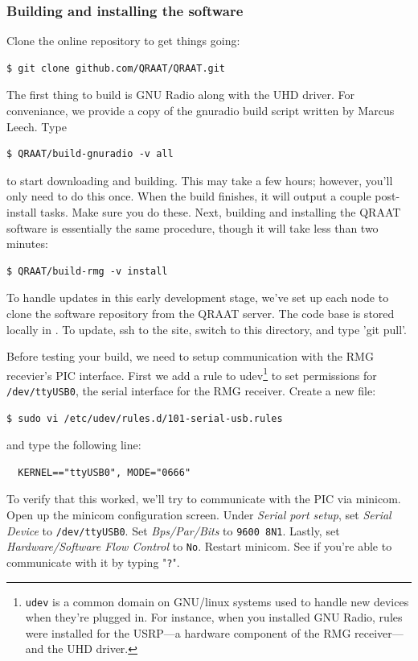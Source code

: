 \documentclass[letter]{article}
\newcounter{foot}
\begin{document}
\subsubsection{Building and installing the software}
Clone the online repository to get things going:
\begin{verbatim}
$ git clone github.com/QRAAT/QRAAT.git
\end{verbatim}
The first thing to build is GNU Radio along with the UHD driver. For conveniance, we provide a copy 
of the gnuradio build script written by Marcus Leech. Type
\begin{verbatim}
$ QRAAT/build-gnuradio -v all
\end{verbatim}
to start downloading and building. This may take a few hours; however, you'll only need to do this once. When the 
build finishes, it will output a couple post-install tasks. Make sure you do these. Next, building
and installing the QRAAT software is essentially the same procedure, though it will take less than 
two minutes: 
\begin{verbatim}
$ QRAAT/build-rmg -v install
\end{verbatim}

To handle updates in this early development stage, we've set up each node to clone 
the software repository from the QRAAT server. The code base is stored locally in
. To update, ssh to the site, switch to this directory, and type
'git pull'.

Before testing your build, we need to setup communication with the RMG recevier's PIC interface. First we 
add a rule to udev\footnote{\texttt{udev} is a common domain on GNU/linux systems used to handle 
new devices when they're plugged in. For instance, when you installed GNU Radio, rules were installed 
for the USRP---a hardware component of the RMG receiver---and the UHD driver.} to set permissions for 
\texttt{/dev/ttyUSB0}, the serial interface for the RMG receiver. Create a new file: 
\begin{verbatim}
$ sudo vi /etc/udev/rules.d/101-serial-usb.rules
\end{verbatim}
and type the following line: 
\begin{verbatim}
  KERNEL=="ttyUSB0", MODE="0666"
\end{verbatim}
To verify that this worked, we'll try to communicate with the PIC via minicom. Open up the minicom
configuration screen. Under \textit{Serial port setup}, set \textit{Serial Device} to \texttt{/dev/ttyUSB0}.
Set \textit{Bps/Par/Bits} to \texttt{9600 8N1}. Lastly, set \textit{Hardware/Software Flow Control} to 
\texttt{No}. Restart minicom. See if you're able to communicate with it by typing "\texttt{?}".  
\end{document}
